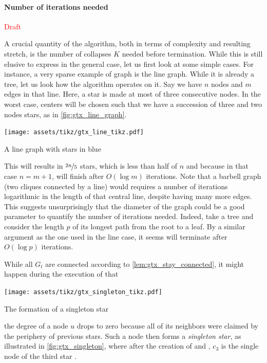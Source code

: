 \paragraph{Number of iterations needed}\label{par:number_of_iteration}%

\textcolor{red}{\LARGE Draft}

A crucial quantity of the \gtx{} algorithm, both in terms of complexity and resulting stretch, is
the number of collapses $K$ needed before termination. While this is still elusive to express in the
general case, let us first look at some simple cases. For instance, a very sparse example of graph
is the line graph. While it is already a tree, let us look how the \gtx{} algorithm operates on it.
Say we have $n$ nodes and $m$ edges in that line. Here, a star is made at most of three
consecutive nodes. In the worst case, centers will be chosen such that we have a succession of three
and two nodes stars, as in \autoref{fig:gtx_line_graph}.%
\begin{marginfigure}
  \centering
  \texttt{[image: assets/tikz/gtx\_line\_tikz.pdf]}
  \caption{A line graph with stars in blue}
  \label{fig:gtx_line_graph}
\end{marginfigure}
This will results in $\nicefrac{2n}{5}$ stars, which is less than half of $n$ and because in that
case $n=m+1$, \gtx{} will finish after $O(\log m)$ iterations. Note that a barbell graph (two
cliques connected by a line) would requires a number of iterations logarithmic in the length of that
central line, despite having many more edges. This suggests unsurprisingly that the diameter of the graph
could be a good parameter to quantify the number of iterations needed. Indeed, take a tree and consider
the length $p$ of its longest path from the root to a leaf. By a similar argument as the one used in
the line case, it seems \gtx{} will terminate after $O(\log p)$ iterations.

\iffalse
While all $G_t$ are connected according to \autoref{lem:gtx_stay_connected}, it might happen during
the execution of \extractStar{} that%
\begin{marginfigure}
  \centering
  \texttt{[image: assets/tikz/gtx\_singleton\_tikz.pdf]}
  \caption{The formation of a singleton star}
  \label{fig:gtx_singleton}
\end{marginfigure}
the degree of a node $u$ drops to zero because all of its neighbors were claimed by the
periphery of previous stars. Such a node then forms a \emph{singleton star}, as illustrated in
\autoref{fig:gtx_singleton}, where after the creation of  and , $c_3$ is the
single node of the third star .


